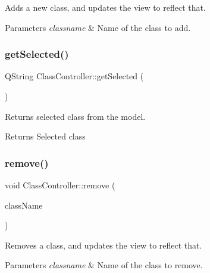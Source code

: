 Adds a new class, and updates the view to reflect that. 


\begin{DoxyParams}{Parameters}
{\em classname} & Name of the class to add. \\
\hline
\end{DoxyParams}
\mbox{\label{classClassController_a9132aaebc5cbc174e6fc3c3a1d46c695}} 
\subsubsection{\texorpdfstring{get\+Selected()}{getSelected()}}
{\footnotesize\ttfamily Q\+String Class\+Controller\+::get\+Selected (\begin{DoxyParamCaption}{ }\end{DoxyParamCaption})}



Returns selected class from the model. 

\begin{DoxyReturn}{Returns}
Selected class 
\end{DoxyReturn}
\mbox{\label{classClassController_ac8d209c4e52899c11020f6a3b35f6416}} 
\subsubsection{\texorpdfstring{remove()}{remove()}}
{\footnotesize\ttfamily void Class\+Controller\+::remove (\begin{DoxyParamCaption}\item[{const Q\+String \&}]{class\+Name }\end{DoxyParamCaption})}



Removes a class, and updates the view to reflect that. 


\begin{DoxyParams}{Parameters}
{\em classname} & Name of the class to remove. \\
\hline
\end{DoxyParams}
\mbox{\label{classClassController_a98a04b6200241406efd95504a2f5fa29}} 

